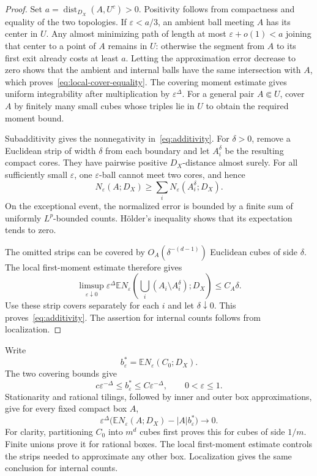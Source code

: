 \documentclass[11pt,letterpaper]{article}
\newcommand{\E}{\mathbb E}
\newcommand{\eps}{\varepsilon}
\DeclareMathOperator{\dist}{dist}
\theoremstyle{definition}
\theoremstyle{remark}
\numberwithin{equation}{section}
\begin{document}
\begin{proof}
Set $a=\dist_{D_X}(A,U^c)>0$. Positivity follows from compactness and equality of the two topologies. If $\eps<a/3$, an ambient ball meeting $A$ has its center in $U$. Any almost minimizing path of length at most $\eps+o(1)<a$ joining that center to a point of $A$ remains in $U$: otherwise the segment from $A$ to its first exit already costs at least $a$. Letting the approximation error decrease to zero shows that the ambient and internal balls have the same intersection with $A$, which proves~\eqref{eq:local-cover-equality}. The covering moment estimate gives uniform integrability after multiplication by $\eps^\Delta$. For a general pair $A\Subset U$, cover $A$ by finitely many small cubes whose triples lie in $U$ to obtain the required moment bound.

Subadditivity gives the nonnegativity in~\eqref{eq:additivity}. For $\delta>0$, remove a Euclidean strip of width $\delta$ from each boundary and let $A_i^\delta$ be the resulting compact cores. They have pairwise positive $D_X$-distance almost surely. For all sufficiently small $\eps$, one $\eps$-ball cannot meet two cores, and hence
\begin{equation*}
 N_\eps(A;D_X)\ge\sum_iN_\eps(A_i^\delta;D_X).
\end{equation*}
On the exceptional event, the normalized error is bounded by a finite sum of uniformly $L^p$-bounded counts. H\"older's inequality shows that its expectation tends to zero.

The omitted strips can be covered by $O_A(\delta^{-(d-1)})$ Euclidean cubes of side $\delta$. The local first-moment estimate therefore gives
\begin{equation*}
 \limsup_{\eps\downarrow0}\eps^\Delta
       \E N_\eps\!\left(\bigcup_i(A_i\setminus A_i^\delta);D_X\right)
 \le C_A\delta.
\end{equation*}
Use these strip covers separately for each $i$ and let $\delta\downarrow0$. This proves~\eqref{eq:additivity}. The assertion for internal counts follows from localization.
\end{proof}

Write
\begin{equation}\label{eq:b-star}
 b_\eps^*=\E N_\eps(C_0;D_X).
\end{equation}
The two covering bounds give
\begin{equation}\label{eq:b-star-bounds}
 c\eps^{-\Delta}\le b_\eps^*\le C\eps^{-\Delta},\qquad 0<\eps\le1.
\end{equation}
Stationarity and rational tilings, followed by inner and outer box approximations, give for every fixed compact box $A$,
\begin{equation}\label{eq:intensity-before-rv}
 \eps^\Delta\bigl(\E N_\eps(A;D_X)-|A|b_\eps^*\bigr)
 \longrightarrow0.
\end{equation}
For clarity, partitioning $C_0$ into $m^d$ cubes first proves this for cubes of side $1/m$. Finite unions prove it for rational boxes. The local first-moment estimate controls the strips needed to approximate any other box. Localization gives the same conclusion for internal counts.
\end{document}

